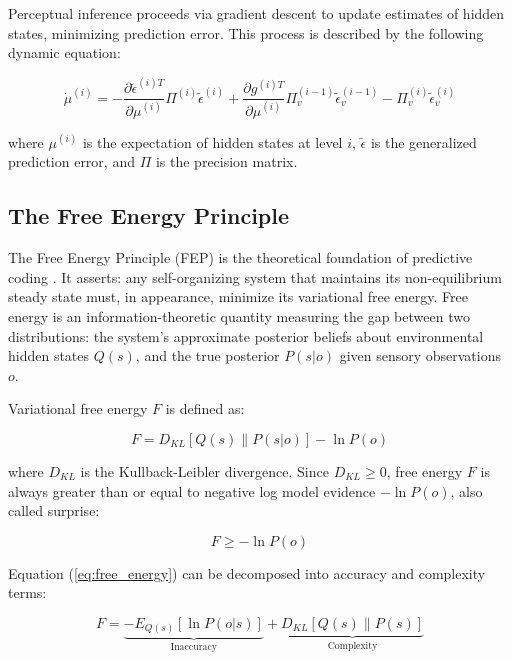 \documentclass[11pt,a4paper]{article}
\begin{document}
Perceptual inference proceeds via gradient descent to update estimates of hidden states, minimizing prediction error. This process is described by the following dynamic equation:

\begin{equation}
\dot{\mu}^{(i)} = -\frac{\partial \tilde{\epsilon}^{(i)T}}{\partial \mu^{(i)}} \Pi^{(i)} \tilde{\epsilon}^{(i)} + \frac{\partial g^{(i)T}}{\partial \mu^{(i)}} \Pi_{v}^{(i-1)} \tilde{\epsilon}_{v}^{(i-1)} - \Pi_{v}^{(i)} \tilde{\epsilon}_{v}^{(i)}
\label{eq:perceptual_inf}
\end{equation}

where $\mu^{(i)}$ is the expectation of hidden states at level $i$, $\tilde{\epsilon}$ is the generalized prediction error, and $\Pi$ is the precision matrix.

\subsection{The Free Energy Principle}

The Free Energy Principle (FEP) is the theoretical foundation of predictive coding \cite{Friston2010}. It asserts: any self-organizing system that maintains its non-equilibrium steady state must, in appearance, minimize its variational free energy. Free energy is an information-theoretic quantity measuring the gap between two distributions: the system's approximate posterior beliefs about environmental hidden states $Q(s)$, and the true posterior $P(s|o)$ given sensory observations $o$.

Variational free energy $F$ is defined as:

\begin{equation}
F = D_{KL}[Q(s) \| P(s|o)] - \ln P(o)
\label{eq:free_energy}
\end{equation}

where $D_{KL}$ is the Kullback-Leibler divergence. Since $D_{KL} \geq 0$, free energy $F$ is always greater than or equal to negative log model evidence $-\ln P(o)$, also called surprise:

\begin{equation}
F \geq -\ln P(o)
\label{eq:fe_bound}
\end{equation}

Equation (\ref{eq:free_energy}) can be decomposed into accuracy and complexity terms:

\begin{equation}
F = \underbrace{-E_{Q(s)}[\ln P(o|s)]}_{\text{Inaccuracy}} + \underbrace{D_{KL}[Q(s) \| P(s)]}_{\text{Complexity}}
\label{eq:fe_decomp}
\end{equation}
\end{document}
